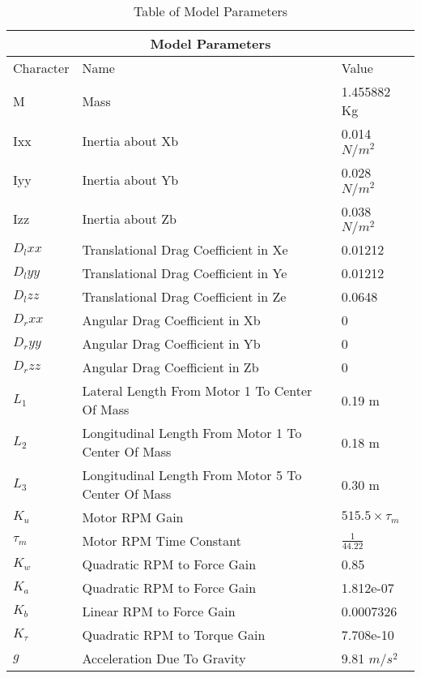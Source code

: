 \documentclass[12pt,a4paper,twoside]{report}
\begin{document}
			\begin{table}[h!]
			\centering
			\begin{tabular}{ |p{1.5cm}||p{9.5cm}|p{5cm}|  }
				\hline
				\multicolumn{3}{|c|}{Model Parameters} \\
				\hline
				Character& Name  & Value  \\
				\hline
				M        &  Mass                                                 & 1.455882 Kg\\
				Ixx      &  Inertia about Xb                                     & 0.014 $N/m^2$\\
				Iyy      &  Inertia about Yb                                     & 0.028 $N/m^2$\\
				Izz      &  Inertia about Zb                                     & 0.038 $N/m^2$\\
				$D_lxx$  &  Translational Drag Coefficient in Xe                 & 0.01212\\
				$D_lyy$  &  Translational Drag Coefficient in Ye                 & 0.01212\\
				$D_lzz$  &  Translational Drag Coefficient in Ze                 & 0.0648\\
				$D_rxx$  &  Angular Drag Coefficient in Xb                       & 0\\
				$D_ryy$  &  Angular Drag Coefficient in Yb                       & 0\\
				$D_rzz$  &  Angular Drag Coefficient in Zb                       & 0\\
				$L_1$    &  Lateral Length From Motor 1 To Center Of Mass        & 0.19 m\\
				$L_2$    &  Longitudinal Length From Motor 1 To Center Of Mass   & 0.18 m\\
				$L_3$    &  Longitudinal Length From Motor 5 To Center Of Mass   & 0.30 m\\
				$K_u$    &  Motor RPM Gain                                       & $515.5 \times \tau_m$\\
				$\tau_m$ &  Motor RPM Time Constant                              & $\frac{1}{44.22}$\\
				$K_w$    &  Quadratic RPM to Force Gain                          & 0.85\\
				$K_a$    &  Quadratic RPM to Force Gain                          & 1.812e-07\\
				$K_b$    &  Linear RPM to Force Gain                             & 0.0007326\\
				$K_\tau$ &  Quadratic RPM to Torque Gain                         & 7.708e-10\\
				$g$      & Acceleration Due To Gravity                           & 9.81 $m/s^2$\\
				\hline
			\end{tabular}
			\caption{Table of Model Parameters}
			\label{table:modelparameters}
			\end{table}
			
\end{document}
